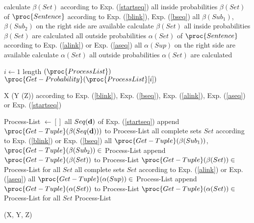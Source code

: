 \documentclass[english]{jnlp_1.4}
\begin{document}
\vspace {5mm}
{\small
\begin{codebox}
\li calculate $\beta (Set)$ according to Exp. (\ref{startseq})
\li \Repeat
\li 	\For all inside probabilities $\beta (Set)$ of $\proc{Sentence}$
\li 		\Do \Comment according to Exp. (\ref{blink}), Exp. (\ref{bseq})
\li				\If all $\beta (Sub_1)$, $\beta (Sub_2)$ on the right side are available
\li				\Then calculate $\beta (Set)$
				\End
			\End
\li	\Until all inside probabilities $\beta (Set)$ are calculated
\li \Repeat
\li 	\For all outside probabilities $\alpha (Set)$ of $\proc{Sentence}$
\li 		\Do \Comment according to Exp. (\ref{alink}) or Exp. (\ref{aseq})
\li				\If all $\alpha (Sup)$ on the right side are available
\li				\Then calculate $\alpha (Set)$
				\End
			\End
\li	\Until all outside probabilities $\alpha (Set)$ are calculated
\end{codebox}
\vspace{1mm}
\begin{codebox}
\li \For $i \gets 1$ \To length $(\proc{ProcessList})$
\li		\Do $\proc{Get-Probability} (\proc{ProcessList} [i])$
	\End
\end{codebox}
\vspace{1mm}
\begin{codebox}
\li	\Return X (Y (Z)) according to Exp. (\ref{blink}), Exp. (\ref{bseq}), Exp. (\ref{alink}), Exp. (\ref{aseq}) or Exp. (\ref{startseq})
\end{codebox}
\vspace{1mm}
\begin{codebox}
\li Process-List $\gets []$
\li \For all $Seq ({\bf d})$ of Exp. (\ref{startseq})
\li 	\Do append $\proc{Get-Tuple} (\beta (Seq ({\bf d})))$ to Process-List
		\End
\li \Repeat
\li \For all complete sets $Set$
\li 	\Do \Comment according to Exp. (\ref{blink}) or Exp. (\ref{bseq})
\li				\If all $\proc{Get-Tuple} (\beta (Sub_1))$, $\proc{Get-Tuple} (\beta (Sub_2))\in$ Process-List
\li			\Then append $\proc{Get-Tuple} (\beta (Set))$ to Process-List
			\End
		\End
\li	\Until $\proc{Get-Tuple} (\beta (Set))\in$ Process-List for all $Set$
\li \Repeat
\li \For all complete sets $Set$
\li 	\Do \Comment according to Exp. (\ref{alink}) or Exp. (\ref{aseq})
\li				\If all $\proc{Get-Tuple} (\alpha (Sup))\in$ Process-List
\li			\Then append $\proc{Get-Tuple} (\alpha (Set))$ to Process-List
			\End
		\End
\li	\Until $\proc{Get-Tuple} (\alpha (Set))\in$ Process-List for all $Set$
\li \Return Process-List
\end{codebox}
\vspace{1mm}
\begin{codebox}
\li	\Return (X, Y, Z)
\end{codebox}
}
\end{document}
